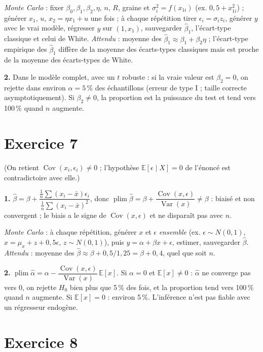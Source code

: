\documentclass[11pt,a4paper]{article}
\newcommand{\E}{\mathbb{E}}\newcommand{\Var}{\operatorname{Var}}\newcommand{\Cov}{\operatorname{Cov}}
\newcommand{\plim}{\operatorname{plim}}
\begin{document}
\emph{Monte Carlo} : fixer $\beta_0,\beta_1,\beta_2,\eta$, $n$, $R$, graine et $\sigma_i^2=f(x_{1i})$ (ex. $0{,}5+x_{1i}^2$) ; générer $x_1$, $u$, $x_2=\eta x_1+u$ une fois ; à chaque répétition tirer $\epsilon_i=\sigma_iz_i$, générer $y$ avec le vrai modèle, régresser $y$ sur $(1,x_1)$, sauvegarder $\hat\beta_1$, l'écart-type classique et celui de White. \emph{Attendu} : moyenne des $\hat\beta_1\approx\beta_1+\beta_2\eta$ ; l'écart-type empirique des $\hat\beta_1$ diffère de la moyenne des écarts-types classiques mais est proche de la moyenne des écarts-types de White.

\textbf{2.} Dans le modèle complet, avec un $t$ robuste : si la vraie valeur est $\beta_2=0$, on rejette dans environ $\alpha=5\,\%$ des échantillons (erreur de type I ; taille correcte asymptotiquement). Si $\beta_2\neq0$, la proportion est la puissance du test et tend vers 100\,\% quand $n$ augmente.

\section*{Exercice 7}
(On retient $\Cov(x_i,\epsilon_i)\neq0$ ; l'hypothèse $\E[\epsilon\mid X]=0$ de l'énoncé est contradictoire avec elle.)

\textbf{1.} $\hat\beta=\beta+\dfrac{\frac1n\sum(x_i-\bar x)\epsilon_i}{\frac1n\sum(x_i-\bar x)^2}$, donc $\plim\hat\beta=\beta+\dfrac{\Cov(x,\epsilon)}{\Var(x)}\neq\beta$ : biaisé et non convergent ; le biais a le signe de $\Cov(x,\epsilon)$ et ne disparaît pas avec $n$.

\emph{Monte Carlo} : à chaque répétition, générer $x$ et $\epsilon$ \emph{ensemble} (ex. $\epsilon\sim N(0,1)$, $x=\mu_x+z+0{,}5\epsilon$, $z\sim N(0,1)$), puis $y=\alpha+\beta x+\epsilon$, estimer, sauvegarder $\hat\beta$. \emph{Attendu} : moyenne des $\hat\beta\approx\beta+0{,}5/1{,}25=\beta+0{,}4$, quel que soit $n$.

\textbf{2.} $\plim\hat\alpha=\alpha-\dfrac{\Cov(x,\epsilon)}{\Var(x)}\,\E[x]$. Si $\alpha=0$ et $\E[x]\neq0$ : $\hat\alpha$ ne converge pas vers 0, on rejette $H_0$ bien plus que 5\,\% des fois, et la proportion tend vers 100\,\% quand $n$ augmente. Si $\E[x]=0$ : environ 5\,\%. L'inférence n'est pas fiable avec un régresseur endogène.

\section*{Exercice 8}
\end{document}
